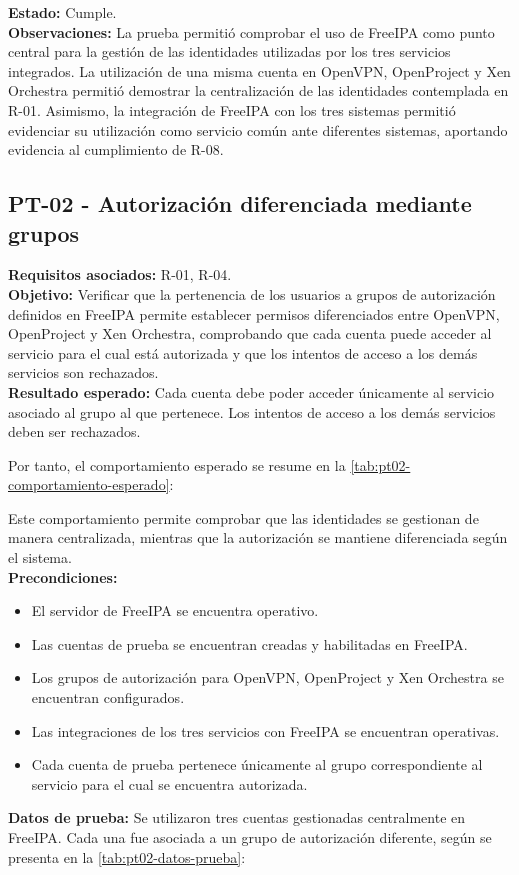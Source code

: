 \textbf{Estado:} Cumple.\\
\textbf{Observaciones:} La prueba permitió comprobar el uso de FreeIPA como punto central para la gestión de las identidades utilizadas por los tres servicios integrados. La utilización de una misma cuenta en OpenVPN, OpenProject y Xen Orchestra permitió demostrar la centralización de las identidades contemplada en R-01.
Asimismo, la integración de FreeIPA con los tres sistemas permitió evidenciar su utilización como servicio común ante diferentes sistemas, aportando evidencia al cumplimiento de R-08.

\subsection{PT-02 - Autorización diferenciada mediante grupos}\label{subsec:pt02}
\textbf{Requisitos asociados:} R-01, R-04.\\
\textbf{Objetivo:} Verificar que la pertenencia de los usuarios a grupos de autorización definidos en FreeIPA permite establecer permisos diferenciados entre OpenVPN, OpenProject y Xen Orchestra, comprobando que cada cuenta puede acceder al servicio para el cual está autorizada y que los intentos de acceso a los demás servicios son rechazados.\\
\textbf{Resultado esperado:} Cada cuenta debe poder acceder únicamente al servicio asociado al grupo al que pertenece. Los intentos de acceso a los demás servicios deben ser rechazados.

Por tanto, el comportamiento esperado se resume en la \autoref{tab:pt02-comportamiento-esperado}:



Este comportamiento permite comprobar que las identidades se gestionan de manera centralizada, mientras que la autorización se mantiene diferenciada según el sistema.\\
\textbf{Precondiciones:}
\begin{itemize}
	\item El servidor de FreeIPA se encuentra operativo.
	\item Las cuentas de prueba se encuentran creadas y habilitadas en FreeIPA.
	\item Los grupos de autorización para OpenVPN, OpenProject y Xen Orchestra se encuentran configurados.
	\item Las integraciones de los tres servicios con FreeIPA se encuentran operativas.
	\item Cada cuenta de prueba pertenece únicamente al grupo correspondiente al servicio para el cual se encuentra autorizada.
\end{itemize}
\textbf{Datos de prueba:} Se utilizaron tres cuentas gestionadas centralmente en FreeIPA. Cada una fue asociada a un grupo de autorización diferente, según se presenta en la \autoref{tab:pt02-datos-prueba}:

